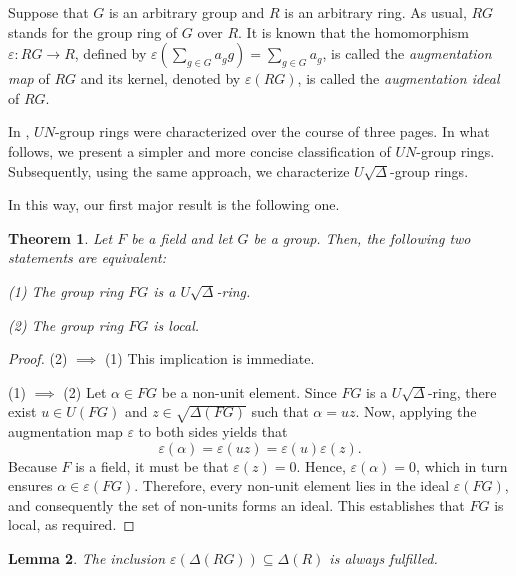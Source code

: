\documentclass[11pt]{amsart}
\newtheorem{theorem}{Theorem}[section]
\newtheorem{lemma}[theorem]{Lemma}
\theoremstyle{definition}
\begin{document}
Suppose that $G$ is an arbitrary group and $R$ is an arbitrary ring. As usual, $RG$ stands for the group ring of $G$ over $R$. It is known that the homomorphism $\varepsilon : RG\rightarrow R$, defined by $\varepsilon \left(\sum_{g\in G}a_{g}g\right)=\sum_{g\in G}a_{g}$, is called the {\it augmentation map} of $RG$ and its kernel, denoted by $\varepsilon (RG)$, is called the {\it augmentation ideal} of $RG$.

In \cite{kjun}, $UN$-group rings were characterized over the course of three pages. In what follows, we present a simpler and more concise classification of $UN$-group rings. Subsequently, using the same approach, we characterize $U\sqrt{\Delta}$-group rings.


\medskip

In this way, our first major result is the following one.

\begin{theorem}
Let \( F \) be a field and let \( G \) be a group. Then, the following two statements are equivalent:

(1) The group ring \( FG \) is a \( U\sqrt{\Delta} \)-ring.

(2) The group ring \( FG \) is local.
\end{theorem}

\begin{proof}
(2) \(\implies\) (1) This implication is immediate.
	
(1) \(\implies\) (2) Let \(\alpha \in FG\) be a non-unit element. Since \(FG\) is a \( U\sqrt{\Delta} \)-ring, there exist \( u \in U(FG) \) and \( z \in \sqrt{\Delta(FG)} \) such that $\alpha = uz$. Now, applying the augmentation map \(\varepsilon\) to both sides yields that
	\[
	\varepsilon(\alpha) = \varepsilon(u z) = \varepsilon(u) \varepsilon(z).
	\]
Because \(F\) is a field, it must be that \(\varepsilon(z) = 0\). Hence, $\varepsilon(\alpha) = 0$, which in turn ensures \(\alpha \in \varepsilon(FG)\). Therefore, every non-unit element lies in the ideal \(\varepsilon(FG)\), and consequently the set of non-units forms an ideal. This establishes that \(FG\) is local, as required.
\end{proof}

\begin{lemma}\label{1}
The inclusion $\varepsilon(\Delta(RG)) \subseteq \Delta(R)$ is always fulfilled.
\end{lemma}
\end{document}
